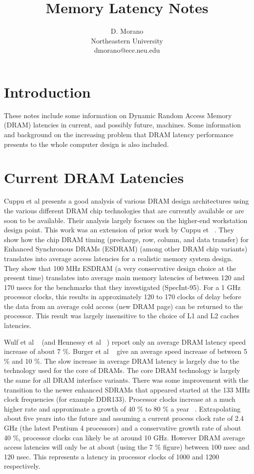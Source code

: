 \documentclass[10pt,dvips]{article}
\begin{document}
\parskip 2mm
%
%
\title{Memory Latency Notes}
%
\author{
D. Morano\\
Northeastern University\\
dmorano@ece.neu.edu\\
}
%
\maketitle
%
%
%
\section{Introduction}
%
These notes include some information on 
Dynamic Random Access Memory (DRAM) latencies
in current, and possibly future, machines.
Some information and background on the increasing 
problem that DRAM latency performance presents to the whole
computer design is also included.
%
\section{Current DRAM Latencies}
%
Cuppu et al \cite{cuppu01high} presents a good analysis of
various DRAM design architectures using the various different DRAM chip
technologies that are currently available or are soon to be
available.  Their analysis largely focuses on the higher-end
workstation design point.
This work was an extension of prior work by Cuppu et ~\cite{cuppu99performance}.
They show
how the chip DRAM timing (precharge, row, column, and data
transfer) for Enhanced Synchronous DRAMs (ESDRAM) 
(among other DRAM chip variants) translates
into average access latencies for a realistic memory system design.  
They show
that 100 MHz ESDRAM (a very conservative design choice at the present time) 
translates into average main
memory latencies of between 120 and 170 nsecs for the benchmarks that
they investigated (SpecInt-95).  For a 1 GHz processor clocks,
this results in approximately 120 to 170 clocks of delay
before the data from an average cold access (new DRAM page) 
can be returned to the processor.  This result was largely
insensitive to the choice of L1 and L2 caches latencies.

Wulf et al ~\cite{wulf95hitting} (and Hennessy et al ~\cite{hennpatt95})
report only an average DRAM
latency speed increase of about 7 \%.  
Burger et al ~\cite{burger95declining}
give an average speed increase of between 5 \% and 10 \%.
The slow increase in average DRAM latency is largely due to the
technology used for the core of DRAMs.  The core DRAM technology
is largely the same for all DRAM interface variants.
There was some improvement with the transition to the newer
enhanced SDRAMs that appeared started at the 133 MHz clock
frequencies (for example DDR133).
Processor clocks increase at a much higher rate and approximate
a growth of 40 \% to 80 \% a year ~\cite{davis00new}.
Extrapolating about five years into the future and assuming a
current process clock rate of 2.4 GHz (the latest Pentium 4
processors) and a conservative growth rate of about 40 \%, 
processor clocks
can likely be at around 10 GHz.  However DRAM average access
latencies will only be at about (using the 7 \% figure)
between 100 nsec and 120 nsec.  This represents a latency in
processor clocks of 1000 and 1200 respectively.
%
\end{document}

